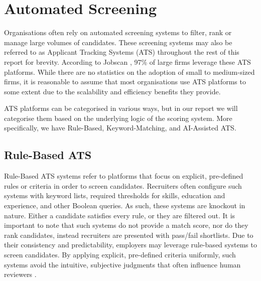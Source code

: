 \section{Automated Screening}
\label{sec:automated-screening}

Organisations often rely on automated screening systems to filter, rank or manage large volumes of candidates.
These screening systems may also be referred to as Applicant Tracking Systems (ATS) throughout the rest of this report
for brevity. According to Jobscan \cite{jobscan2022}, 97\% of large firms leverage these ATS platforms.
While there are no statistics on the adoption of small to medium-sized firms, it is reasonable to assume that
most organisations use ATS platforms to some extent due to the scalability and efficiency benefits they provide.

ATS platforms can be categorised in various ways, but in our report we will categorise them based on the underlying
logic of the scoring system. More specifically, we have Rule-Based, Keyword-Matching, and AI-Assisted ATS.

\subsection{Rule-Based ATS}
Rule-Based ATS systems refer to platforms that focus on explicit, pre-defined rules or criteria in order to 
screen candidates. Recruiters often configure such systems with keyword lists, required thresholds for
skills, education and experience, and other Boolean queries. As such, these systems are knockout in
nature. Either a candidate satisfies every rule, or they are filtered out. It is important to note that
such systems do not provide a match score, nor do they rank candidates, instead recruiters are presented with
pass/fail shortlists. Due to their consistency and predictability, employers may leverage rule-based systems to screen candidates. 
By applying explicit, pre-defined criteria uniformly, such systems avoid the intuitive, subjective judgments that 
often influence human reviewers \cite{highhouse2008stubborn}.


